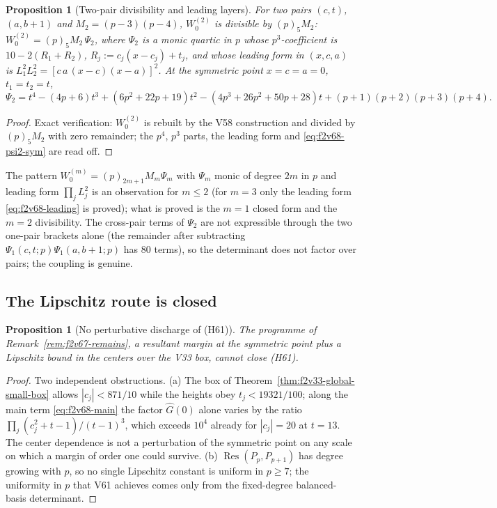 \documentclass[11pt]{article}
\newtheorem{proposition}[theorem]{Proposition}
\theoremstyle{definition}
\theoremstyle{remark}
\begin{document}
\begin{proposition}[Two-pair divisibility and leading layers]
\label{prop:f2v68-twopair}
For two pairs \((c,t)\), \((a,b+1)\) and \(M_2=(p-3)(p-4)\),
\(W_0^{(2)}\) is divisible by \((p)_5M_2\):
\(W_0^{(2)}=(p)_5M_2\,\Psi_2\), where \(\Psi_2\) is a monic quartic in
\(p\) whose \(p^3\)-coefficient is \(10-2(R_1+R_2)\),
\(R_j:=c_j(x-c_j)+t_j\), and whose leading form in \((x,c,a)\) is
\(L_1^2L_2^2=[c\,a\,(x-c)(x-a)]^2\).  At the symmetric point
\(x=c=a=0\), \(t_1=t_2=t\),
\begin{equation}
 \Psi_2=t^4-(4p+6)t^3+(6p^2+22p+19)t^2-(4p^3+26p^2+50p+28)t+(p+1)(p+2)(p+3)(p+4).
 \label{eq:f2v68-psi2-sym}
\end{equation}
\end{proposition}

\begin{proof}
Exact verification: \(W_0^{(2)}\) is rebuilt by the V58 construction and
divided by \((p)_5M_2\) with zero remainder; the \(p^4\), \(p^3\) parts,
the leading form and \eqref{eq:f2v68-psi2-sym} are read off.
\end{proof}

The pattern \(W_0^{(m)}=(p)_{2m+1}M_m\Psi_m\) with \(\Psi_m\) monic of
degree \(2m\) in \(p\) and leading form \(\prod_jL_j^2\) is an
observation for \(m\le2\) (for \(m=3\) only the leading form
\eqref{eq:f2v68-leading} is proved); what is proved is the \(m=1\)
closed form and the \(m=2\) divisibility.  The cross-pair terms of \(\Psi_2\) are not
expressible through the two one-pair brackets alone (the remainder after
subtracting \(\Psi_1(c,t;p)\Psi_1(a,b+1;p)\) has \(80\) terms), so the
determinant does not factor over pairs; the coupling is genuine.

\subsection{The Lipschitz route is closed}

\begin{proposition}[No perturbative discharge of (H61)]
\label{prop:f2v68-lipschitz-nogo}
The programme of Remark~\ref{rem:f2v67-remains}, a resultant margin at the
symmetric point plus a Lipschitz bound in the centers over the V33 box,
cannot close (H61).
\end{proposition}

\begin{proof}
Two independent obstructions.  (a) The box of
Theorem~\ref{thm:f2v33-global-small-box} allows \(|c_j|<871/10\) while
the heights obey \(t_j<19321/100\); along the main term
\eqref{eq:f2v68-main} the factor \(\widehat G(0)\) alone varies by the
ratio \(\prod_j(c_j^2+t-1)/(t-1)^3\), which exceeds \(10^{4}\) already for
\(|c_j|=20\) at \(t=13\).  The center dependence is not a perturbation of
the symmetric point on any scale on which a margin of order one could
survive.  (b) \(\operatorname{Res}(P_p,P_{p+1})\) has degree growing with
\(p\), so no single Lipschitz constant is uniform in \(p\ge7\); the
uniformity in \(p\) that V61 achieves comes only from the fixed-degree
balanced-basis determinant.
\end{proof}
\end{document}
